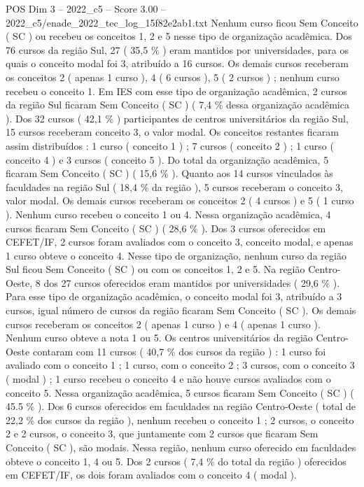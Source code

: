 \begin{textsample}{POS Dim 3 – 2022\_c5 – Score 3.00 – 2022\_c5/enade\_2022\_tec\_log\_15f82e2ab1.txt}
Nenhum curso ficou Sem Conceito ( SC ) ou recebeu os conceitos 1, 2 e 5 nesse tipo de organização acadêmica.
Dos 76 cursos da região Sul, 27 ( 35,5 \% ) eram mantidos por universidades, para os quais o conceito modal foi 3, atribuído a 16 cursos.
Os demais cursos receberam os conceitos 2 ( apenas 1 curso ), 4 ( 6 cursos ), 5 ( 2 cursos ) ; nenhum curso recebeu o conceito 1.
Em IES com esse tipo de organização acadêmica, 2 cursos da região Sul ficaram Sem Conceito ( SC ) ( 7,4 \% dessa organização acadêmica ).
Dos 32 cursos ( 42,1 \% ) participantes de centros universitários da região Sul, 15 cursos receberam conceito 3, o valor modal.
Os conceitos restantes ficaram assim distribuídos : 1 curso ( conceito 1 ) ; 7 cursos ( conceito 2 ) ; 1 curso ( conceito 4 ) e 3 cursos ( conceito 5 ).
Do total da organização acadêmica, 5 ficaram Sem Conceito ( SC ) ( 15,6 \% ).
Quanto aos 14 cursos vinculados às faculdades na região Sul ( 18,4 \% da região ), 5 cursos receberam o conceito 3, valor modal.
Os demais cursos receberam os conceitos 2 ( 4 cursos ) e 5 ( 1 curso ).
Nenhum curso recebeu o conceito 1 ou 4.
Nessa organização acadêmica, 4 cursos ficaram Sem Conceito ( SC ) ( 28,6 \% ).
Dos 3 cursos oferecidos em CEFET/IF, 2 cursos foram avaliados com o conceito 3, conceito modal, e apenas 1 curso obteve o conceito 4.
Nesse tipo de organização, nenhum curso da região Sul ficou Sem Conceito ( SC ) ou com os conceitos 1, 2 e 5.
Na região Centro-Oeste, 8 dos 27 cursos oferecidos eram mantidos por universidades ( 29,6 \% ).
Para esse tipo de organização acadêmica, o conceito modal foi 3, atribuído a 3 cursos, igual número de cursos da região ficaram Sem Conceito ( SC ).
Os demais cursos receberam os conceitos 2 ( apenas 1 curso ) e 4 ( apenas 1 curso ).
Nenhum curso obteve a nota 1 ou 5.
Os centros universitários da região Centro-Oeste contaram com 11 cursos ( 40,7 \% dos cursos da região ) : 1 curso foi avaliado com o conceito 1 ; 1 curso, com o conceito 2 ; 3 cursos, com o conceito 3 ( modal ) ; 1 curso recebeu o conceito 4 e não houve cursos avaliados com o conceito 5.
Nessa organização acadêmica, 5 cursos ficaram Sem Conceito ( SC ) ( 45.5 \% ).
Dos 6 cursos oferecidos em faculdades na região Centro-Oeste ( total de 22,2 \% dos cursos da região ), nenhum recebeu o conceito 1 ; 2 cursos, o conceito 2 e 2 cursos, o conceito 3, que juntamente com 2 cursos que ficaram Sem Conceito ( SC ), são modais.
Nessa região, nenhum curso oferecido em faculdades obteve o conceito 1, 4 ou 5.
Dos 2 cursos ( 7,4 \% do total da região ) oferecidos em CEFET/IF, os dois foram avaliados com o conceito 4 ( modal ).

\end{textsample}
